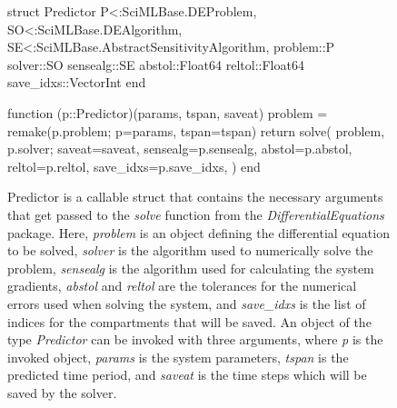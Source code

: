 \begin{figure}[!htb]
\begin{jllisting}
struct Predictor{
    P<:SciMLBase.DEProblem,
    SO<:SciMLBase.DEAlgorithm,
    SE<:SciMLBase.AbstractSensitivityAlgorithm,
}
    problem::P
    solver::SO
    sensealg::SE
    abstol::Float64
    reltol::Float64
    save_idxs::Vector{Int}
end

function (p::Predictor)(params, tspan, saveat)
    problem = remake(p.problem; p=params, tspan=tspan)
    return solve(
        problem,
        p.solver;
        saveat=saveat,
        sensealg=p.sensealg,
        abstol=p.abstol,
        reltol=p.reltol,
        save_idxs=p.save_idxs,
    )
end
\end{jllisting}
\caption{Predictor is a callable struct that contains the necessary arguments that get passed to the \textit{solve} function from the \textit{DifferentialEquations} package. Here, \textit{problem} is an object defining the differential equation to be solved, \textit{solver} is the algorithm used to numerically solve the problem, \textit{sensealg} is the algorithm used for calculating the system gradients, \textit{abstol} and \textit{reltol} are the tolerances for the numerical errors used when solving the system, and \textit{save\_idxs} is the list of indices for the compartments that will be saved. An object of the type \textit{Predictor} can be invoked with three arguments, where \textit{p} is the invoked object, \textit{params} is the system parameters, \textit{tspan} is the predicted time period, and \textit{saveat} is the time steps which will be saved by the solver.}
\label{fig:diffeq-seird-predictor}
\end{figure}

